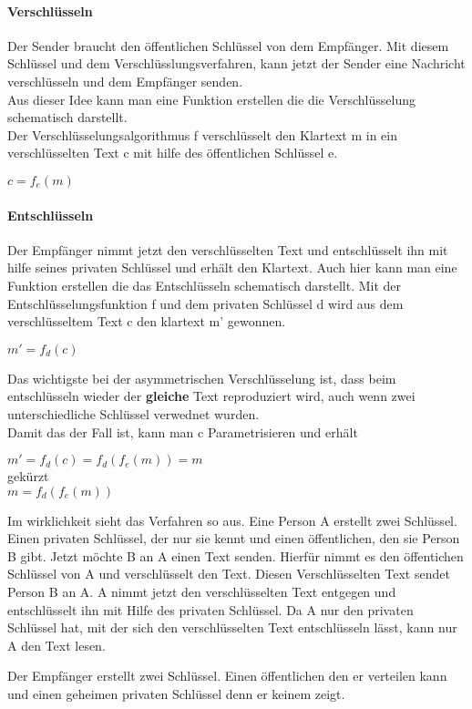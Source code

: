 \paragraph{Verschlüsseln}
Der Sender braucht den öffentlichen Schlüssel von dem Empfänger. Mit diesem Schlüssel und dem Verschlüsslungsverfahren, kann jetzt der Sender eine Nachricht verschlüsseln und dem Empfänger senden.\\
Aus dieser Idee kann man eine Funktion erstellen die die Verschlüsselung schematisch darstellt.\\
Der Verschlüsselungsalgorithmus f verschlüsselt den Klartext m in ein verschlüsselten Text c mit hilfe des öffentlichen Schlüssel e.
 \begin{center}
 $ c = f_e (m) $
 \end{center}
\paragraph{Entschlüsseln}
Der Empfänger nimmt jetzt den verschlüsselten Text und entschlüsselt ihn mit hilfe seines privaten Schlüssel und erhält den Klartext.
Auch hier kann man eine Funktion erstellen die das Entschlüsseln schematisch darstellt.
Mit der Entschlüsselungsfunktion f und dem privaten Schlüssel d wird aus dem verschlüsseltem Text c den klartext m' gewonnen.
\begin{center}
$ m' = f_d (c) $
\end{center}
Das wichtigste bei der asymmetrischen Verschlüsselung ist, dass beim entschlüsseln wieder der \textbf{gleiche} Text reproduziert wird, auch wenn zwei unterschiedliche Schlüssel verwednet wurden.\\
Damit das der Fall ist, kann man c Parametrisieren und erhält
\begin{center}
$ m' = f_d (c) = f_d (f_e (m) ) = m $\\
gekürzt\\
$ m = f_d ( f_e (m) )$
\end{center}
Im wirklichkeit sieht das Verfahren so aus. Eine Person A erstellt zwei Schlüssel. Einen privaten Schlüssel, der nur sie kennt und einen öffentlichen, den sie Person B gibt. Jetzt möchte B an A einen Text senden. Hierfür nimmt es den öffentichen Schlüssel von A und verschlüsselt den Text.
Diesen Verschlüsselten Text sendet Person B an A. 
A nimmt jetzt den verschlüsselten Text entgegen und entschlüsselt ihn mit Hilfe des privaten Schlüssel.
Da A nur den privaten Schlüssel hat, mit der sich den verschlüsselten Text entschlüsseln lässt, kann nur A den Text lesen.

Der Empfänger erstellt zwei Schlüssel. Einen öffentlichen den er verteilen kann und einen geheimen privaten Schlüssel denn er keinem zeigt. 
